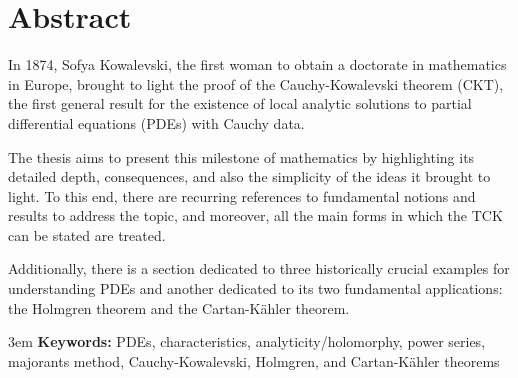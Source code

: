 \chapter*{Abstract}

In 1874, Sofya Kowalevski, the first woman to obtain a doctorate in mathematics in Europe, brought to light the proof of the Cauchy-Kowalevski theorem (CKT), the first general result for the existence of local analytic solutions to partial differential equations (PDEs) with Cauchy data.

\vspace{6mm}
The thesis aims to present this milestone of mathematics by highlighting its detailed depth, consequences, and also the simplicity of the ideas it brought to light. To this end, there are recurring references to fundamental notions and results to address the topic, and moreover, all the main forms in which the TCK can be stated are treated.

\vspace{6mm}
Additionally, there is a section dedicated to three historically crucial examples for understanding PDEs and another dedicated to its two fundamental applications: the Holmgren theorem and the Cartan-Kähler theorem.

\vspace{6mm}
\emergencystretch 3em
\textbf{Keywords:} PDEs, characteristics, analyticity/holomorphy, power series, majorants method, Cauchy-Kowalevski, Holmgren, and Cartan-Kähler theorems

\newpage
\blankpage
